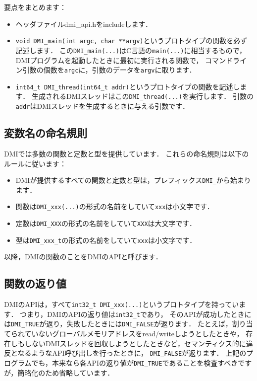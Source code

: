 \documentclass[report,12pt]{jsbook}
\begin{document}
要点をまとめます：

\begin{itemize}
\item ヘッダファイルdmi\_api.hをincludeします．
\item \texttt{void DMI\_main(int argc, char **argv)}というプロトタイプの関数を必ず記述します．
  この\texttt{DMI\_main(...)}はC言語の\texttt{main(...)}に相当するもので，
  DMIプログラムを起動したときに最初に実行される関数で，
  コマンドライン引数の個数を\texttt{argc}に，引数のデータを\texttt{argv}に取ります．
\item \texttt{int64\_t DMI\_thread(int64\_t addr)}というプロトタイプの関数を記述します．
  生成されるDMIスレッドはこの\texttt{DMI\_thread(...)}を実行します．
  引数の\texttt{addr}はDMIスレッドを生成するときに与える引数です．
\end{itemize}

\subsection{変数名の命名規則}

DMIでは多数の関数と定数と型を提供しています．
これらの命名規則は以下のルールに従います：

\begin{itemize}
\item DMIが提供するすべての関数と定数と型は，プレフィックス\texttt{DMI\_}から始まります．
\item 関数は\texttt{DMI\_xxx(...)}の形式の名前をしていて\texttt{xxx}は小文字です．
\item 定数は\texttt{DMI\_XXX}の形式の名前をしていて\texttt{XXX}は大文字です．
\item 型は\texttt{DMI\_xxx\_t}の形式の名前をしていて\texttt{xxx}は小文字です．
\end{itemize}

以降，DMIの関数のことをDMIのAPIと呼びます．

\subsection{関数の返り値}

DMIのAPIは，すべて\texttt{int32\_t DMI\_xxx(...)}というプロトタイプを持っています．
つまり，DMIのAPIの返り値は\texttt{int32\_t}であり，
そのAPIが成功したときには\texttt{DMI\_TRUE}が返り，失敗したときには\texttt{DMI\_FALSE}が返ります．
たとえば，割り当てられていないグローバルメモリアドレスをread/writeしようとしたときや，
存在しもしないDMIスレッドを回収しようとしたときなど，セマンティクス的に違反となるようなAPI呼び出しを行ったときに，
\texttt{DMI\_FALSE}が返ります．
上記のプログラムでも，本来なら各APIの返り値が\texttt{DMI\_TRUE}であることを検査すべきですが，簡略化のため省略しています．
\end{document}
